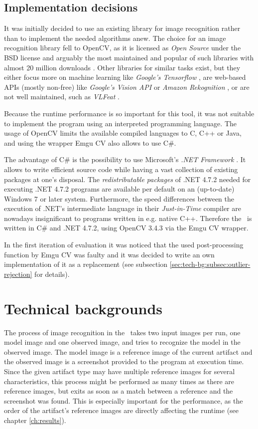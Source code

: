 \subsection{Implementation decisions}

It was initially decided to use an existing library for image recognition rather than to implement the needed algorithms anew. The choice for an image recognition library fell to OpenCV, as it is licensed as \emph{Open Source} under the BSD license and arguably the most maintained and popular of such libraries with almost 20 million downloads \cite{opencv_downloads}. Other libraries for similar tasks exist, but they either focus more on machine learning like \emph{Google's Tensorflow} \cite{tensorflow}, are web-based APIs (mostly non-free) like \emph{Google's Vision API} \cite{vision_api} or \emph{Amazon Rekognition} \cite{rekognition}, or are not well maintained, such as \emph{VLFeat} \cite{vlfeat}.

Because the runtime performance is so important for this tool, it was not suitable to implement the program using an interpreted programming language. The usage of OpenCV limits the available compiled languages to C, C++ or Java, and using the wrapper Emgu CV also allows to use C\#.

The advantage of C\# is the possibility to use Microsoft's \emph{.NET Framework} \cite{dotnet4_7_2}. It allows to write efficient source code while having a vast collection of existing packages at one's disposal. The \emph{redistributable packages} of .NET 4.7.2 needed for executing .NET 4.7.2 programs are available per default on an (up-to-date) Windows 7 or later system. Furthermore, the speed differences between the execution of .NET's intermediate language in their \emph{Just-in-Time} compiler are nowadays insignificant to programs written in e.g. native C++. Therefore the \vd~is written in C\# and .NET 4.7.2, using OpenCV 3.4.3 via the Emgu CV wrapper.

In the first iteration of evaluation it was noticed that the used post-processing function by Emgu CV was faulty and it was decided to write an own implementation of it as a replacement (see subsection \ref{sec:tech-bg:subsec:outlier-rejection} for details).

\section{Technical backgrounds}\label{sec:tech-bg}

The process of image recognition in the \vad~takes two input images per run, one model image and one observed image, and tries to recognize the model in the observed image. The model image is a reference image of the current artifact and the observed image is a screenshot provided to the program at execution time. Since the given artifact type may have multiple reference images for several characteristics, this process might be performed as many times as there are reference images, but exits as soon as a match between a reference and the screenshot was found. This is especially important for the performance, as the order of the artifact's reference images are directly affecting the runtime (see chapter \ref{ch:results}).

